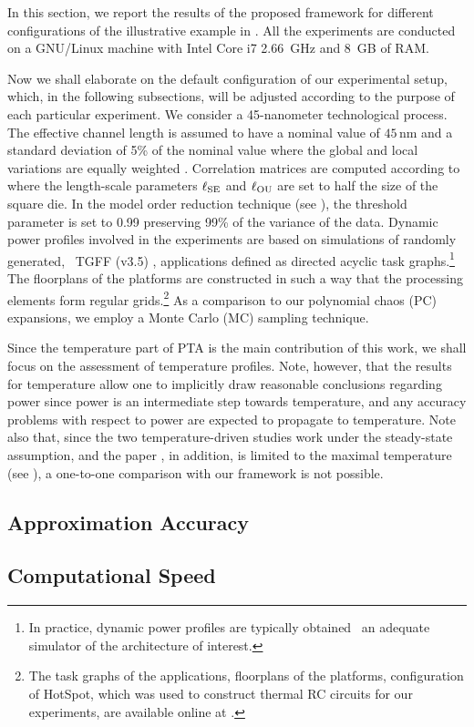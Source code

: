 
In this section, we report the results of the proposed framework for different configurations of the illustrative example in .
All the experiments are conducted on a GNU/Linux machine with Intel Core i7 2.66~GHz and 8~GB of RAM.

Now we shall elaborate on the default configuration of our experimental setup, which, in the following subsections, will be adjusted according to the purpose of each particular experiment.
We consider a 45-nanometer technological process.
The effective channel length is assumed to have a nominal value of $45\,\text{nm}$ and a standard deviation of 5\% of the nominal value where the global and local variations are equally weighted \cite{juan2011, juan2012}.
Correlation matrices are computed according to  where the length-scale parameters $\ell_{\text{SE}}$ and $\ell_{\text{OU}}$ are set to half the size of the square die.
In the model order reduction technique (see ), the threshold parameter is set to 0.99 preserving 99\% of the variance of the data.
Dynamic power profiles involved in the experiments are based on simulations of randomly generated, \via\ TGFF (v3.5) \cite{dick1998}, applications defined as directed acyclic task graphs.\footnote{In practice, dynamic power profiles are typically obtained \via\ an adequate simulator of the architecture of interest.}
The floorplans of the platforms are constructed in such a way that the processing elements form regular grids.\footnote{The task graphs of the applications, floorplans of the platforms, configuration of HotSpot, which was used to construct thermal RC circuits for our experiments, are available online at \cite{sources}.}
As a comparison to our polynomial chaos (PC) expansions, we employ a Monte Carlo (MC) sampling technique.

Since the temperature part of PTA is the main contribution of this work, we shall focus on the assessment of temperature profiles.
Note, however, that the results for temperature allow one to implicitly draw reasonable conclusions regarding power since power is an intermediate step towards temperature, and any accuracy problems with respect to power are expected to propagate to temperature.
Note also that, since the two temperature-driven studies \cite{juan2011, juan2012} work under the steady-state assumption, and the paper \cite{juan2011}, in addition, is limited to the maximal temperature (see ), a one-to-one comparison with our framework is not possible.

\subsection{Approximation Accuracy} 


\subsection{Computational Speed} 

